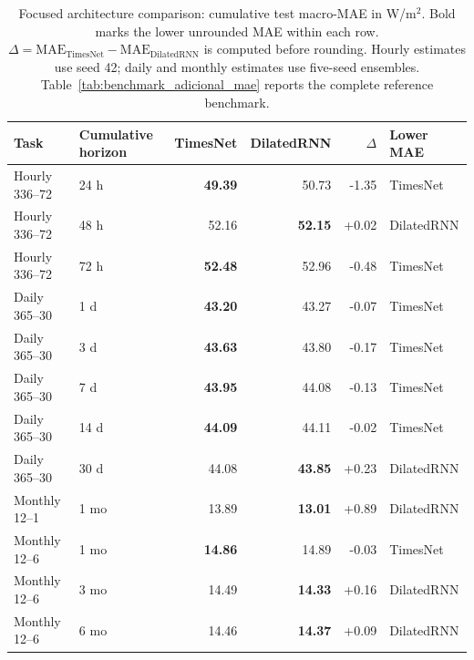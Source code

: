\begin{table}[!t]
\centering
\caption{Focused architecture comparison: cumulative test macro-MAE in W/m$^2$. Bold marks the lower unrounded MAE within each row. $\Delta=\mathrm{MAE}_{\mathrm{TimesNet}}-\mathrm{MAE}_{\mathrm{DilatedRNN}}$ is computed before rounding. Hourly estimates use seed 42; daily and monthly estimates use five-seed ensembles. Table~\ref{tab:benchmark_adicional_mae} reports the complete reference benchmark.}
\label{tab:architecture_winners}
\small
\setlength{\tabcolsep}{5pt}
\begin{tabular}{llrrrl}
\toprule
Task & Cumulative horizon & TimesNet & DilatedRNN & $\Delta$ & Lower MAE \\
\midrule
Hourly 336--72 & 24 h & \textbf{49.39} & 50.73 & -1.35 & TimesNet \\
Hourly 336--72 & 48 h & 52.16 & \textbf{52.15} & +0.02 & DilatedRNN \\
Hourly 336--72 & 72 h & \textbf{52.48} & 52.96 & -0.48 & TimesNet \\
\addlinespace
Daily 365--30 & 1 d & \textbf{43.20} & 43.27 & -0.07 & TimesNet \\
Daily 365--30 & 3 d & \textbf{43.63} & 43.80 & -0.17 & TimesNet \\
Daily 365--30 & 7 d & \textbf{43.95} & 44.08 & -0.13 & TimesNet \\
Daily 365--30 & 14 d & \textbf{44.09} & 44.11 & -0.02 & TimesNet \\
Daily 365--30 & 30 d & 44.08 & \textbf{43.85} & +0.23 & DilatedRNN \\
\addlinespace
Monthly 12--1 & 1 mo & 13.89 & \textbf{13.01} & +0.89 & DilatedRNN \\
\addlinespace
Monthly 12--6 & 1 mo & \textbf{14.86} & 14.89 & -0.03 & TimesNet \\
Monthly 12--6 & 3 mo & 14.49 & \textbf{14.33} & +0.16 & DilatedRNN \\
Monthly 12--6 & 6 mo & 14.46 & \textbf{14.37} & +0.09 & DilatedRNN \\
\bottomrule
\end{tabular}
\end{table}
